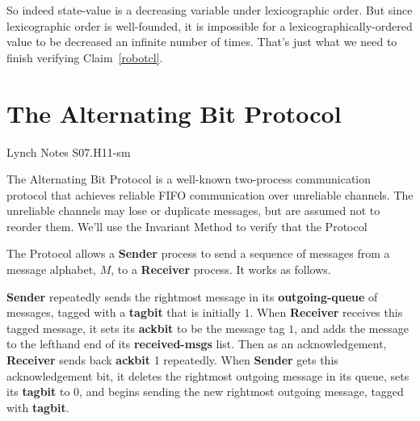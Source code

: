So indeed state-value is a decreasing variable under lexicographic order.
But since lexicographic order is well-founded, it is impossible for a
lexicographically-ordered value to be decreased an infinite number of
times.  That's just what we need to finish verifying Claim~\ref{robotcl}.
\fi

\begin{problems}
\homeworkproblems








\classproblems







\end{problems}

\section{The Alternating Bit Protocol}

\begin{editingnotes}
Lynch Notes S07.H11-sm
\end{editingnotes}

The Alternating Bit Protocol is a well-known two-process communication
protocol that achieves reliable FIFO communication over unreliable
channels.  The unreliable channels may lose or duplicate messages, but
are assumed not to reorder them.  We'll use the
Invariant Method to verify that the Protocol

The Protocol allows a \textbf{Sender} process to send a sequence of
messages from a message alphabet, $M$, to a \textbf{Receiver}
process. It works as follows.

\textbf{Sender} repeatedly sends the rightmost message in its
\textbf{outgoing-queue} of messages, tagged with a \textbf{tagbit}
that is initially $1$.  When \textbf{Receiver} receives this tagged
message, it sets its \textbf{ackbit} to be the message tag $1$, and
adds the message to the lefthand end of its \textbf{received-msgs}
list.  Then as an acknowledgement, \textbf{Receiver} sends back
\textbf{ackbit} 1 repeatedly.  When \textbf{Sender} gets this
acknowledgement bit, it deletes the rightmost outgoing message in its
queue, sets its \textbf{tagbit} to 0, and begins sending the new
rightmost outgoing message, tagged with \textbf{tagbit}.

